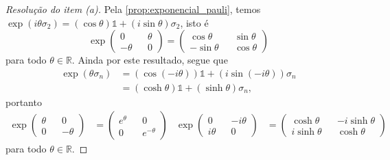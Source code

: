 \begin{proof}[Resolução do item (a)]
    Pela \cref{prop:exponencial_pauli}, temos \(\exp(i\theta \sigma_2) = (\cos\theta)\mathds{1} + (i \sin \theta) \sigma_2\), isto é
    \begin{equation*}
        \exp \begin{pmatrix}
            0 && \theta\\
            -\theta && 0
        \end{pmatrix} = \begin{pmatrix}
            \cos\theta && \sin\theta\\
            -\sin\theta && \cos\theta
        \end{pmatrix}
    \end{equation*}
    para todo \(\theta \in \mathbb{R}\). Ainda por este resultado, segue que
    \begin{align*}
        \exp(\theta \sigma_n) &= (\cos(-i\theta))\mathds{1} + (i \sin(-i\theta))\sigma_n\\
                              &= (\cosh\theta)\mathds{1} + (\sinh\theta)\sigma_n,
    \end{align*}
    portanto
    \begin{align*}
        \exp \begin{pmatrix}
            \theta && 0\\
            0 && - \theta
            \end{pmatrix} &=
        \begin{pmatrix}
            e^\theta && 0\\
            0 && e^{-\theta}
        \end{pmatrix}&
        \exp \begin{pmatrix}
            0 && -i\theta\\
            i \theta && 0
            \end{pmatrix} &= \begin{pmatrix}
            \cosh\theta && -i\sinh\theta\\
            i\sinh\theta && \cosh\theta
        \end{pmatrix}
    \end{align*}
    para todo \(\theta \in \mathbb{R}\).
\end{proof}

